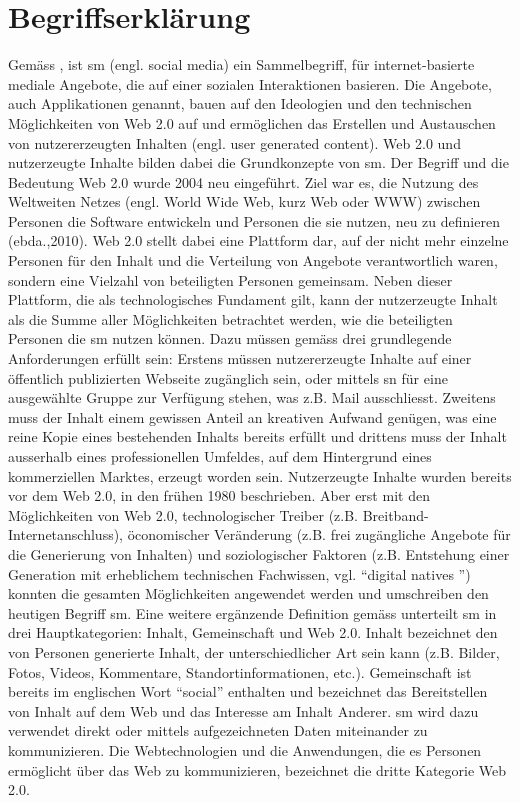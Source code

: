 \section{Begriffserklärung}\label{sec.begriff}
Gemäss , ist \gls{sm} (engl. social media) ein Sammelbegriff, für internet-basierte mediale Angebote, die auf einer sozialen Interaktionen basieren. Die Angebote, auch Applikationen genannt, bauen auf den Ideologien und den technischen Möglichkeiten von Web 2.0 auf \cite{Kaplan:2010} und ermöglichen das Erstellen und Austauschen von nutzererzeugten Inhalten (engl. user generated content).\newline
Web 2.0 und nutzerzeugte Inhalte bilden dabei die Grundkonzepte von \gls{sm}. Der Begriff und die Bedeutung Web 2.0 wurde 2004 neu eingeführt. Ziel war es, die Nutzung des Weltweiten Netzes (engl. World Wide Web, kurz Web oder WWW) zwischen Personen die Software entwickeln und Personen die sie nutzen, neu zu definieren (ebda.,2010). Web 2.0 stellt dabei eine Plattform dar, auf der nicht mehr einzelne Personen für den Inhalt und die Verteilung von Angebote verantwortlich waren, sondern eine Vielzahl von beteiligten Personen gemeinsam. Neben dieser Plattform, die als technologisches Fundament gilt, kann der nutzerzeugte Inhalt als die Summe aller Möglichkeiten betrachtet werden, wie die beteiligten Personen die \gls{sm} nutzen können. Dazu müssen gemäss  drei grundlegende Anforderungen erfüllt sein: Erstens müssen nutzererzeugte Inhalte auf einer öffentlich publizierten Webseite zugänglich sein, oder mittels \gls{sn} für eine ausgewählte Gruppe zur Verfügung stehen, was z.B. Mail ausschliesst. Zweitens muss der Inhalt einem gewissen Anteil an kreativen Aufwand genügen, was eine reine Kopie eines bestehenden Inhalts bereits erfüllt und drittens muss der Inhalt ausserhalb eines professionellen Umfeldes, auf dem Hintergrund eines kommerziellen Marktes, erzeugt worden sein. Nutzerzeugte Inhalte wurden bereits vor dem Web 2.0, in den frühen 1980 beschrieben. Aber erst mit den Möglichkeiten von Web 2.0, technologischer Treiber (z.B. Breitband-Internetanschluss), öconomischer Veränderung (z.B. frei zugängliche Angebote für die Generierung von Inhalten) und soziologischer Faktoren (z.B. Entstehung einer Generation mit erheblichem technischen Fachwissen, vgl. \textquotedblleft digital natives \textquotedblright) konnten die gesamten Möglichkeiten angewendet werden und umschreiben den heutigen Begriff \gls{sm}.\newline 
Eine weitere ergänzende Definition gemäss  unterteilt \gls{sm} in drei Hauptkategorien: Inhalt, Gemeinschaft und Web 2.0. Inhalt bezeichnet den von Personen generierte Inhalt, der unterschiedlicher Art sein kann (z.B. Bilder, Fotos, Videos, Kommentare, Standortinformationen, etc.). Gemeinschaft ist bereits im englischen Wort \textquotedblleft social\textquotedblright{} enthalten und bezeichnet das Bereitstellen von Inhalt auf dem Web und das Interesse am Inhalt Anderer. \gls{sm} wird dazu verwendet direkt oder mittels aufgezeichneten Daten miteinander zu kommunizieren. Die Webtechnologien und die Anwendungen, die es Personen ermöglicht über das Web zu kommunizieren, bezeichnet die dritte Kategorie Web 2.0. \newline

